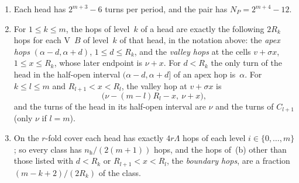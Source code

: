 \begin{lemma}\label{lem:dnp-classes}
\notformalized
\begin{enumerate}[label=(\alph*)]
\item Each head has $2^{m+3}-6$ turns per period, and the pair has $N_P=2^{m+4}-12$.
\item For $1\le k\le m$, the hops of level~$k$ of a head are exactly the following $2R_k$ hops for each V~$B$ of level~$k$ of
that head, in the notation above: the \emph{apex hops} $(\alpha-d,\alpha+d)$, $1\le d\le R_k$, and the \emph{valley hops} at
the cells $v+\sigma x$, $1\le x\le R_k$, whose later endpoint is $\nu+x$. For $d<R_k$ the only turn of the head in the
half-open interval $(\alpha-d,\alpha+d]$ of an apex hop is~$\alpha$. For $k\le l\le m$ and $R_{l+1}<x<R_l$, the valley hop at
$v+\sigma x$ is
\[
  \bigl(\nu-(m-l)R_l-x,\ \nu+x\bigr),
\]
and the turns of the head in its half-open interval are $\nu$ and the turns of $C_{l+1}$ (only $\nu$ if $l=m$).
\item On the $r$-fold cover each head has exactly $4r\Lambda$ hops of each level $i\in\{0,\dots,m\}$; so every class has
$n_{\mathrm h}/(2(m+1))$ hops, and the hops of~(b) other than those listed with $d<R_k$ or $R_{l+1}<x<R_l$, the
\emph{boundary hops}, are a fraction $(m-k+2)/(2R_k)$ of the class.
\end{enumerate}
\end{lemma}


